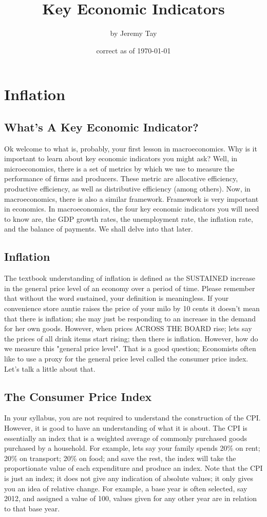 \RequirePackage{../../dominatrix}

\title{Key Economic Indicators}
\author{\large by Jeremy Tay}
\date{\small correct as of \today}

\maketitle
\tableofcontents
\section{Inflation}
\subsection{What's A Key Economic Indicator?}
Ok welcome to what is, probably, your first lesson in macroeconomics. Why is it important to learn about key economic indicators you might ask? Well, in microeconomics, there is a set of metrics by which we use to measure the performance of firms and producers. These metric are allocative efficiency, productive efficiency, as well as distributive efficiency (among others). Now, in macroeconomics, there is also a similar framework. Framework is very important in economics. In macroeconomics, the four key economic indicators you will need to know are, the GDP growth rates, the unemployment rate, the inflation rate, and the balance of payments. We shall delve into that later.
\subsection{Inflation}
The textbook understanding of inflation is defined as the SUSTAINED increase in the general price level of an economy over a period of time. Please remember that without the word sustained, your definition is meaningless. If your convenience store auntie raises the price of your milo by 10 cents it doesn't mean that there is inflation; she may just be responding to an increase in the demand for her own goods. However, when prices ACROSS THE BOARD rise; lets say the prices of all drink items start rising; then there is inflation. However, how do we measure this "general price level". That is a good question; Economists often like to use a proxy for the general price level called the consumer price index. Let's talk a little about that.
\subsection{The Consumer Price Index}
In your syllabus, you are not required to understand the construction of the CPI. However, it is good to have an understanding of what it is about. The CPI is essentially an index that is a  weighted average of commonly purchased goods purchased by a household. For example, lets say your family spends 20\% on rent; 20\% on transport; 20\% on food; and save the rest, the index will take the proportionate value of each expenditure and produce an index. Note that the CPI is just an index; it does not give any indication of absolute values; it only gives you an idea of relative change. For example, a base year is often selected, say 2012, and assigned a value of 100, values given for any other year are in relation to that base year.

